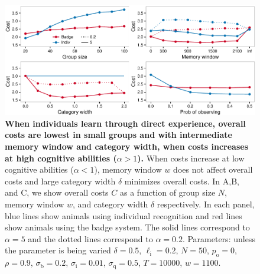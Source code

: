 \begin{figure}
\includegraphics[width=6.85in]{figures/costs.pdf}
\caption{\sffamily\small\textbf{When individuals learn through direct experience, overall costs are lowest in small groups and with intermediate memory window and category width, when costs increases at high cognitive abilities ($\alpha>1$).} When costs increase at low cognitive abilities ($\alpha<1$), memory window $w$ does not affect overall costs and large category width $\delta$ minimizes overall costs. In A,B, and C, we show overall costs $C$ as a function of group size $N$, memory window $w$, and category width $\delta$ respectively. In each panel, blue lines show animals using individual recognition and red lines show animals using the badge system. The solid lines correspond to $\alpha=5$ and the dotted lines correspond to $\alpha=0.2$.  Parameters: unless the parameter is being varied $\delta = 0.5$, $\ell_\text{i}=0.2$, $N=50$, $p_\text{o}=0$, $\rho=0.9$, $\sigma_\text{b}=0.2$, $\sigma_\text{i}=0.01$, $\sigma_\text{q}=0.5$, $T=10000$, $w=1100$.}
\label{costs}
\end{figure}

